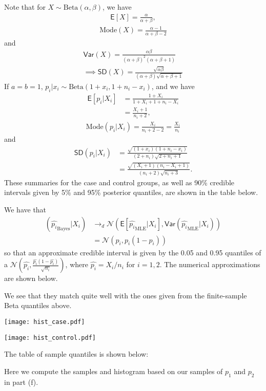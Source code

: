 \documentclass[11pt]{article}
\newcommand*\ba{\[ \begin{aligned}}
\newcommand*\ea{\end{aligned} \]}
\newcommand*\E[1]{\mathsf{E}\left[#1\right]}
\newcommand*\Var[1]{\mathsf{Var}\left(#1\right)}
\newcommand*\SD[1]{\mathsf{SD}\left(#1\right)}
\newcommand*\estim[1]{\widehat{#1}}
\renewcommand\;{\,}
\begin{document}
\item
Note that for $X \sim \text{Beta}(\alpha, \beta)$, we have
\ba
\E{X} = \frac{\alpha}{\alpha + \beta},
\ea
\ba
\text{Mode}(X) = \frac{\alpha - 1}{\alpha + \beta - 2}
\ea
and
\ba
\Var{X} = \frac{ \alpha \beta }{(\alpha + \beta)^2 (\alpha + \beta + 1) } \\
\implies \SD{X} = \frac{\sqrt{\alpha \beta}}
	{(\alpha + \beta) \sqrt{\alpha + \beta + 1} }
\ea
If $a = b = 1$, $p_i | x_i \sim \text{Beta}(1 + x_i, 1 + n_i - x_i)$, and we have
\ba
\E{p_i | X_i} & = \frac{1 + X_i}{1 + X_i + 1 + n_i - X_i} \\
	& = \frac{X_i + 1}{ n_i + 2 },
\ea
\ba
\text{Mode}(p_i | X_i) = \frac{X_i}{ n_i + 2 - 2} = \frac{X_i}{n_i}
\ea
and
\ba
\SD{p_i | X_i} & = \frac{\sqrt{(1 + x_i)(1 + n_i - x_i)}}
	{ (2 + n_i)\sqrt{2 + n_i + 1} } \\
	& = \frac{\sqrt{(X_i + 1)(n_i - X_i + 1)}}
		{(n_i + 2)\sqrt{n_i + 3}}.
\ea
These summaries for the case and control groups, as well as 90\% credible intervals given by 5\% and 95\% posterior quantiles, are shown in the table below.

\item
We have that
\ba
\left( \estim{p_i}_\text{Bayes} | X_i \right) & \to_d \mathcal N \left( \E{ \estim{p_i}_\text{MLE} | X_i },
 \Var{ \estim{p_i}_\text{MLE} | X_i } \right) \\
	& = \mathcal N \left( p_i, p_i (1 - p_i) \right)
\ea
so that an approximate credible interval is given by the 0.05 and 0.95 quantiles of a $\mathcal{N}\left(\estim{p_i}, \frac{\estim{p_i}(1 - \estim{p_i})}{\sqrt{n_i}}\right)$,
where $\estim{p_i} = X_i/n_i$ for $i = 1, 2$.
The numerical approximations are shown below.

We see that they match quite well with the ones given from the finite-sample Beta quantiles above.
\item
\begin{center}
\texttt{[image: hist\_case.pdf]}
\end{center}

\begin{center}
\texttt{[image: hist\_control.pdf]}
\end{center}
The table of sample quantiles is shown below:

\item
Here we compute the samples and histogram based on our samples of $p_1$ and $p_2$ in part (f). 
\end{document}
